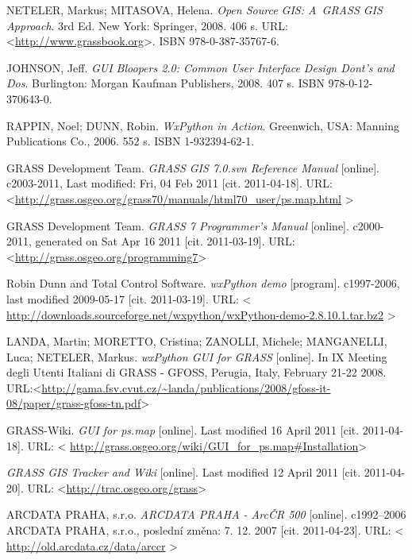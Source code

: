 \documentclass[12pt,a4paper]{article}
\begin{document}
\begin{thebibliography}{99}
\label{literatura}


NETELER, Markus; MITASOVA, Helena. \textit{Open Source GIS:
A~GRASS GIS Approach}. 3rd Ed. New York: Springer, 2008. 406 s. URL:
\textless\url{http://www.grassbook.org}\textgreater. ISBN 978-0-387-35767-6.


JOHNSON, Jeff. \textit{GUI Bloopers 2.0: Common User Interface Design
Dont's and Dos}. Burlington: Morgan Kaufman Publishers, 2008. 407 s. ISBN
978-0-12-370643-0.


RAPPIN, Noel; DUNN, Robin. \emph{WxPython in Action}. Greenwich, USA: Manning
Publications Co., 2006. 552 s. ISBN 1-932394-62-1.


GRASS Development Team. \textit{GRASS GIS 7.0.svn Reference
Manual} [online]. c2003-2011, Last modified: Fri, 04 Feb 2011 [cit.
2011-04-18]. URL:
\textless\url{http://grass.osgeo.org/grass70/manuals/html70_user/ps.map.html}%
\textgreater


GRASS Development Team. \textit{GRASS 7 Programmer's Manual} [online].
c2000-2011, generated on Sat Apr 16 2011 [cit. 2011-03-19].
URL: \textless\url{http://grass.osgeo.org/programming7}\textgreater

Robin Dunn and Total Control Software. \textit{wxPython
demo} [program]. c1997-2006, last modified 2009-05-17 [cit. 2011-03-19]. URL:
\textless
\url{http://downloads.sourceforge.net/wxpython/wxPython-demo-2.8.10.1.tar.bz2}%
\textgreater


LANDA, Martin; MORETTO, Cristina; ZANOLLI, Michele; MANGANELLI, Luca; NETELER, Markus.
\textit{wxPython GUI for GRASS} [online]. In IX Meeting degli Utenti Italiani di GRASS - GFOSS, Perugia, Italy, February 21-22 2008.
URL:\textless\url{http://gama.fsv.cvut.cz/~landa/publications/2008/gfoss-it-08/paper/grass-gfoss-tn.pdf}\textgreater




GRASS-Wiki. \textit{GUI for ps.map} [online]. Last modified
16 April 2011 [cit. 2011-04-18]. URL: \textless
\url{http://grass.osgeo.org/wiki/GUI_for_ps.map\#Installation}\textgreater


\textit{GRASS GIS Tracker and Wiki} [online]. Last modified 12 April 2011
[cit. 2011-04-20].
URL: \textless\url{http://trac.osgeo.org/grass}\textgreater



ARCDATA PRAHA, s.r.o. \textit{ARCDATA PRAHA - ArcČR 500} [online].
c1992–2006 ARCDATA PRAHA, s.r.o., poslední změna: 7. 12. 2007 [cit. 2011-04-23].
URL: \textless
\url{http://old.arcdata.cz/data/arccr} \textgreater



\end{thebibliography}
\end{document}
